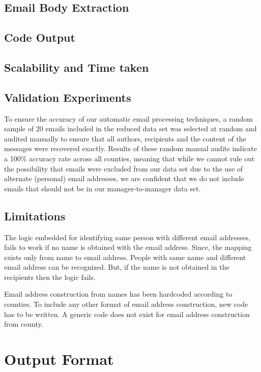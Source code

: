\documentclass[fleqn]{MJDArticle}
\begin{document}
\subsection{Email Body Extraction}
\subsection{Code Output}
\subsection{Scalability and Time taken}


\subsection{Validation Experiments}

To ensure the accuracy of our automatic email processing techniques, a random sample of 20 emails included in the reduced data set was selected at random and audited manually to ensure that all authors, recipients and the content of the messages were recovered exactly. Results of these random manual audits indicate a 100\% accuracy rate across all counties, meaning that while we cannot rule out the possibility that emails were excluded from our data set due to the use of alternate (personal) email addresses, we are confident that we do not include emails that should not be in our manager-to-manager data set.

\subsection{Limitations}
The logic embedded for identifying same person with different email addresses, fails to work if no name is obtained with the email address. Since, the mapping exists only from name to email address. People with same name and different email address can be recognized. But, if the name is not obtained in the recipients then the logic fails. 
\par 
Email address construction from names has been hardcoded according to counties. To include any other format of email address construction, new code has to be written. A generic code does not exist for email address construction from county.


\section{Output Format}
\end{document}
